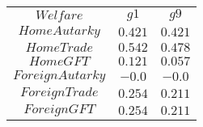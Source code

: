 \begin{tabular}{ccc}
$Welfare$ & $g1$ & $g9$\\
$Home Autarky$ & $0.421$ & $0.421$\\
$Home Trade$ & $0.542$ & $0.478$\\
$Home GFT$ & $0.121$ & $0.057$\\
$Foreign Autarky$ & $-0.0$ & $-0.0$\\
$Foreign Trade$ & $0.254$ & $0.211$\\
$Foreign GFT$ & $0.254$ & $0.211$\\
\end{tabular}
